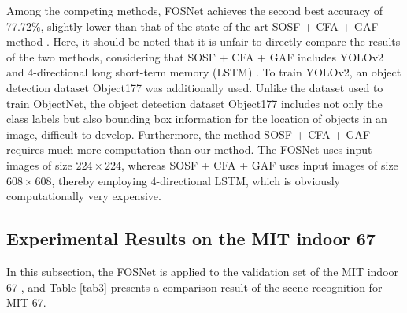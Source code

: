 \documentclass[journal,comsoc]{IEEEtran}
\begin{document}
Among the competing methods, FOSNet achieves the second best accuracy of 77.72\%, slightly lower than that of the state-of-the-art SOSF + CFA + GAF method \cite{b4}. Here, it should be noted that it is unfair to directly compare the results of the two methods, considering that SOSF + CFA + GAF \cite{b4} includes YOLOv2 \cite{b41} and 4-directional long short-term memory (LSTM) \cite{b44}. To train YOLOv2, an object detection dataset Object177 \cite{b47} was additionally used. Unlike the dataset used to train ObjectNet, the object detection dataset Object177 includes not only the class labels but also bounding box information for the location of objects in an image, difficult to develop. Furthermore, the method SOSF + CFA + GAF requires much more computation than our method. The FOSNet uses input images of size $224 \times 224$, whereas SOSF + CFA + GAF uses input images of size $608 \times 608$, thereby employing 4-directional LSTM, which is obviously computationally very expensive.



\subsection{Experimental Results on the MIT indoor 67}
\label{s45}
In this subsection, the FOSNet is applied to the validation set of the MIT indoor 67 \cite{b34}, and Table \ref{tab3} presents a comparison result of the scene recognition for MIT 67.
\end{document}
